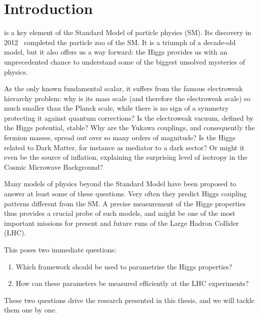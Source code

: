 
 
\chapter{Introduction}
\label{chapter:Introduction}

\cite{Higgs:1964ia, Higgs:1964pj, Englert:1964et} is a
key element of the Standard Model of particle physics (SM). Its
discovery in 2012~\cite{Aad:2012tfa, Chatrchyan:2012xdj} completed the
particle zoo of the SM. It is a triumph of a decade-old model, but it
also offers us a way forward: the Higgs provides us with an
unprecedented chance to understand some of the biggest unsolved
mysteries of physics.

As the only known fundamental scalar, it suffers from the famous
electroweak hierarchy problem: why is its mass scale (and therefore
the electroweak scale) so much smaller than the Planck scale, while
there is no sign of a symmetry protecting it against quantum
corrections? Is the electroweak vacuum, defined by the Higgs
potential, stable?  Why are the Yukawa couplings, and consequently the
fermion masses, spread out over so many orders of magnitude?  Is the
Higgs related to Dark Matter, for instance as mediator to a dark
sector? Or might it even be the source of inflation, explaining the
surprising level of isotropy in the Cosmic Microwave Background?

Many models of physics beyond the Standard Model have been proposed to
answer at least some of these questions. Very often they predict Higgs
coupling patterns different from the SM. A precise measurement of the
Higgs properties thus provides a crucial probe of such models, and
might be one of the most important missions for present and future
runs of the Large Hadron Collider (LHC).

This poses two immediate questions:
%
\begin{enumerate}
\item Which framework should be used to parametrise the Higgs
  properties?
\item How can these parameters be measured efficiently at the LHC
  experiments?
\end{enumerate}
%
These two questions drive the research presented in this thesis, and
we will tackle them one by one.

